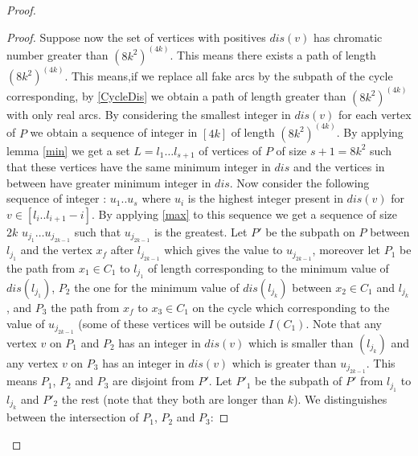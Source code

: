 \documentclass[10pt]{article}
\theoremstyle{plain}
\theoremstyle{definition}
\theoremstyle{remark}
\begin{document}
\begin{proof}
\begin{proof}



Suppose now the set of vertices with positives $dis(v)$ has chromatic number greater than $(8k^2)^(4k)$. 
This means there exists a path of length $(8k^2)^(4k)$. This means,if we replace all fake arcs by the subpath of 
the cycle corresponding, by \ref{CycleDis} we obtain a path of length greater than $(8k^2)^(4k)$ with only real arcs. 
By considering the smallest integer in $dis(v)$ for each vertex of $P$ we obtain a sequence of integer in $[4k]$ of length $(8k^2)^(4k)$. 
By applying lemma \ref{min} we get a set $L = l_1 \dots l_{s+1}$ of vertices of $P$ of size $s+1 = 8k^2$ such that these 
vertices have the same minimum integer in $dis$ and the vertices in between have greater minimum integer in $dis$. 
Now consider the following sequence of integer : $u_1 .. u_s$ where $u_i$ is the highest integer present in $dis(v)$ 
for $v \in [l_i .. l_{i+1} - i]$. 
By applying \ref{max} to this sequence we get a sequence of size $2k$ $u_{j_1} \dots u_{j_{2k-1}}$ such that $u_{j_{2k-1}}$ is the greatest.
Let $P'$ be the subpath on $P$ between $l_{j_1}$ and the vertex $x_f$ after $l_{j_{2k-1}}$ which gives the value to $u_{j_{2k-1}}$,
moreover let $P_1$  be the path from $x_1 \in C_1$ to $l_{j_1}$ of length corresponding to the minimum value of $dis(l_{j_1})$, 
$P_2$ the one for the minimum value of $dis(l_{j_k})$ between $x_2 \in C_1$ and $l_{j_k}$, and $P_3$ the path 
from $x_f$ to $x_3 \in C_1$ on the cycle which corresponding to the value of $u_{j_{2k-1}}$ 
(some of these vertices will be outside $I(C_1)$. Note that any vertex $v$ on $P_1$ and $P_2$ has an integer in $dis(v)$ 
which is smaller than $(l_{j_k})$ and any vertex $v$ on $P_3$ has an integer in $dis(v)$ which is greater than $u_{j_{2k-1}}$. This means 
$P_1$, $P_2$ and $P_3$ are disjoint from $P'$. Let $P'_1$ be the subpath of $P'$ from $l_{j_1}$ to $l_{j_k}$ and  $P'_2$ the rest
(note that they both are longer than $k$). 
We distinguishes between the intersection of $P_1$, $P_2$ and $P_3$:


\end{proof}
\end{proof}
\end{document}
